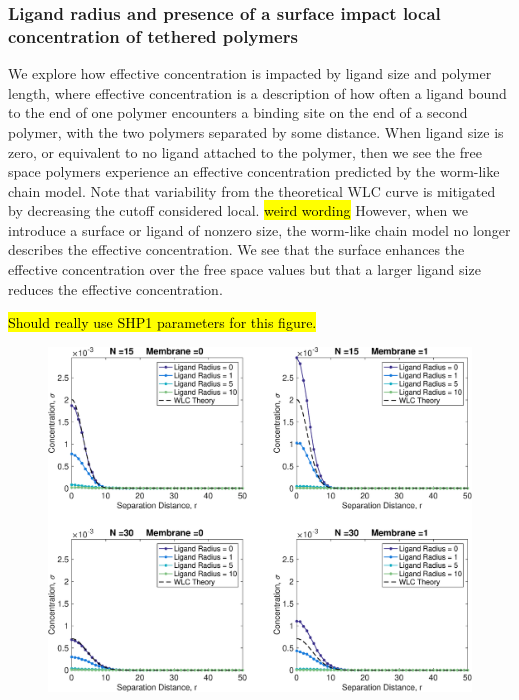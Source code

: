 \documentclass[../../AdvancementSummary.tex]{subfiles}
\begin{document}
\subsubsection{Ligand radius and presence of a surface impact local concentration of tethered polymers}

We explore how effective concentration is impacted by ligand size and polymer length, where effective concentration is a description of how often a ligand bound to the end of one polymer encounters a binding site on the end of a second polymer, with the two polymers separated by some distance. When ligand size is zero, or equivalent to no ligand attached to the polymer, then we see the free space polymers experience an effective concentration predicted by the worm-like chain model. Note that variability from the theoretical WLC curve is mitigated by decreasing the cutoff considered local. \hl{weird wording} However, when we introduce a surface or ligand of nonzero size, the worm-like chain model no longer describes the effective concentration.  We see that the surface enhances the effective concentration over the free space values but that a larger ligand size reduces the effective concentration.

\hl{Should really use SHP1 parameters for this figure.}
\begin{figure}[H]
    \begin{center}
        		\includegraphics[width=0.8\linewidth]{ResultsFigures/EffectiveConcentrationKernel/ConcentrationVSSeparation.eps}
        \caption{}
    \end{center}
\end{figure}
\end{document}
